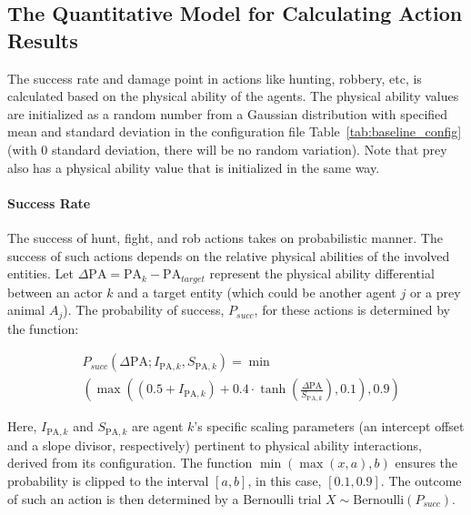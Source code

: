 \subsection{The Quantitative Model for Calculating Action Results}

The success rate and damage point in actions like hunting, robbery, etc, is calculated based on the physical ability of the agents. The physical ability values are initialized as a random number from a Gaussian distribution with specified mean and standard deviation in the configuration file Table~\ref{tab:baseline_config} (with 0 standard deviation, there will be no random variation). Note that prey also has a physical ability value that is initialized in the same way. 

\paragraph{Success Rate}
The success of hunt, fight, and rob actions takes on probabilistic manner. The success of such actions depends on the relative physical abilities of the involved entities. Let $\Delta \mathrm{PA} = \mathrm{PA}_k - \mathrm{PA}_{target}$ represent the physical ability differential between an actor $k$ and a target entity (which could be another agent $j$ or a prey animal $A_j$). The probability of success, $P_{succ}$, for these actions is determined by the function:

{\small
\begin{align*}
&P_{succ}(\Delta \mathrm{PA}; I_{\mathrm{PA},k}, S_{\mathrm{PA},k}) = \min\\&\left(\max\left((0.5 + I_{\mathrm{PA},k}) + 0.4 \cdot \tanh\left(\frac{\Delta \mathrm{PA}}{S_{\mathrm{PA},k}}\right), 0.1\right), 0.9\right)
\end{align*}
}

Here, $I_{\mathrm{PA},k}$ and $S_{\mathrm{PA},k}$ are agent $k$'s specific scaling parameters (an intercept offset and a slope divisor, respectively) pertinent to physical ability interactions, derived from its configuration. The function $\min(\max(x,a),b)$ ensures the probability is clipped to the interval $[a,b]$, in this case, $[0.1, 0.9]$. The outcome of such an action is then determined by a Bernoulli trial $X \sim \text{Bernoulli}(P_{succ})$.

